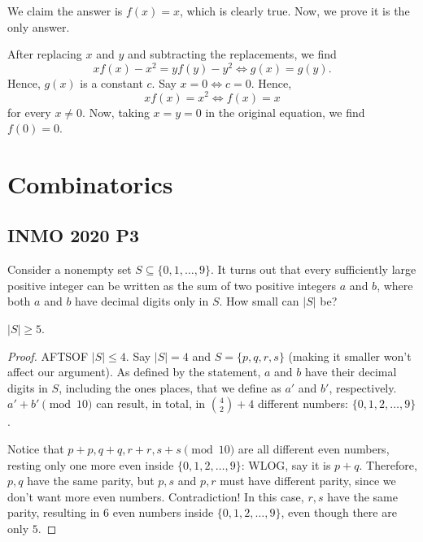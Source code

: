 \documentclass[12pt]{article}
\begin{document}
We claim the answer is $f(x)=x$, which is clearly true. Now, we prove it is the only answer.

After replacing $x$ and $y$ and subtracting the replacements, we find
\[
	xf(x)-x^2=yf(y)-y^2 \iff g(x)=g(y).
\]
Hence, $g(x)$ is a constant $c$. Say $x=0 \iff c=0$. Hence,
\[
	xf(x)=x^2 \iff f(x)=x
\]
for every $x \neq 0$. Now, taking $x=y=0$ in the original equation, we find $f(0)=0$.

\clearpage

\section{Combinatorics}
\subsection{INMO 2020 P3}

\begin{problem}
Consider a nonempty set $S \subseteq \{0, 1, \dots, 9\}$.
It turns out that every sufficiently large positive integer
can be written as the sum of two positive integers $a$ and $b$,
where both $a$ and $b$ have decimal digits only in $S$.
How small can $|S|$ be?
\end{problem}

\begin{claim}
	$|S| \ge 5$.
\end{claim}
\begin{proof}
	AFTSOF $|S| \le 4$. Say $|S|=4$ and $S=\{p,q,r,s\}$ (making it smaller won't affect our argument).
	As defined by the statement, $a$ and $b$ have their decimal digits in $S$,
	including the ones places, that we define as $a'$ and $b'$, respectively. $a'+b' \pmod{10}$
	can result, in total, in $\binom{4}{2}+4$ different numbers: $\{0,1,2, \dots,9\}$.

	Notice that $p+p,q+q,r+r,s+s \pmod{10}$ are all different even numbers, resting only one more even inside
	$\{0,1,2, \dots,9\}$: WLOG, say it is $p+q$. Therefore, $p,q$ have the same parity, but $p,s$ and $p,r$ must
	have different parity, since we don't want more even numbers. Contradiction! In this case, $r,s$
	have the same parity, resulting in $6$ even numbers inside $\{0,1,2, \dots,9\}$, even though there are only $5$.
\end{proof}
\end{document}
